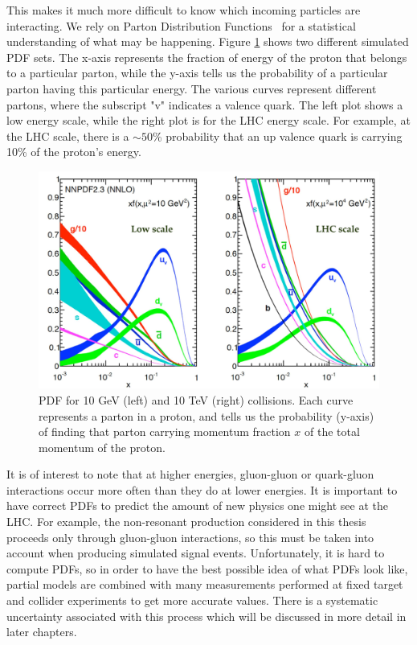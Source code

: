 This makes it much more difficult to know which incoming particles are interacting. We rely on Parton Distribution Functions~\cite{Bourilkov:2006cj,Ball:2014uwa} for a statistical understanding of what may be happening. Figure \ref{Fig:Detect:PDFset} shows two different simulated PDF sets. The x-axis represents the fraction of energy of the proton that belongs to a particular parton, while the y-axis tells us the probability of a particular parton having this particular energy. The various curves represent different partons, where the subscript "v" indicates a valence quark. The left plot shows a low energy scale, while the right plot is for the LHC energy scale. For example, at the LHC scale, there is a $\sim50$\% probability that an up valence quark is carrying 10\% of the proton's energy. 
\begin{figure}[h!]
    \centering
        \includegraphics[width=\textwidth]{F3/PDFset}
        \caption{PDF for 10 GeV (left) and 10 TeV (right) collisions. Each curve represents a parton in a proton, and tells us the probability (y-axis) of finding that parton carrying momentum fraction $x$ of the total momentum of the proton.}
        \label{Fig:Detect:PDFset}
\end{figure}
It is of interest to note that at higher energies, gluon-gluon or quark-gluon interactions occur more often than they do at lower energies. It is important to have correct PDFs to predict the amount of new physics one might see at the LHC. For example, the non-resonant production considered in this thesis proceeds only through gluon-gluon interactions, so this must be taken into account when producing simulated signal events. Unfortunately, it is hard to compute PDFs, so in order to have the best possible idea of what PDFs look like, partial models are combined with many measurements performed at fixed target and collider experiments to get more accurate values. There is a systematic uncertainty associated with this process which will be discussed in more detail in later chapters.

